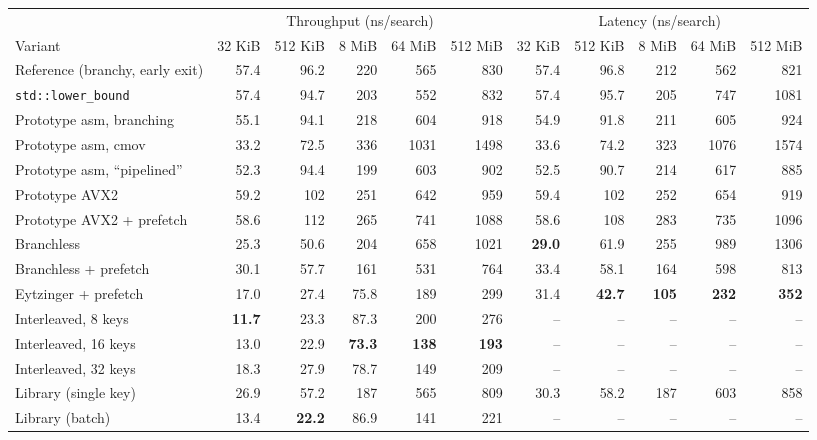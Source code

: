 \begin{tabular}{lrrrrr@{\hskip 1.2em}rrrrr}
\toprule
 & \multicolumn{5}{c}{Throughput (ns/search)} & \multicolumn{5}{c}{Latency (ns/search)}\\
\cmidrule(lr){2-6}\cmidrule(lr){7-11}
Variant & \multicolumn{1}{c}{32 KiB} & \multicolumn{1}{c}{512 KiB} & \multicolumn{1}{c}{8 MiB} & \multicolumn{1}{c}{64 MiB} & \multicolumn{1}{c}{512 MiB} & \multicolumn{1}{c}{32 KiB} & \multicolumn{1}{c}{512 KiB} & \multicolumn{1}{c}{8 MiB} & \multicolumn{1}{c}{64 MiB} & \multicolumn{1}{c}{512 MiB}\\
\midrule
Reference (branchy, early exit) & 57.4 & 96.2 & 220 & 565 & 830 & 57.4 & 96.8 & 212 & 562 & 821\\
\texttt{std::lower\_bound} & 57.4 & 94.7 & 203 & 552 & 832 & 57.4 & 95.7 & 205 & 747 & 1081\\
Prototype asm, branching & 55.1 & 94.1 & 218 & 604 & 918 & 54.9 & 91.8 & 211 & 605 & 924\\
Prototype asm, cmov & 33.2 & 72.5 & 336 & 1031 & 1498 & 33.6 & 74.2 & 323 & 1076 & 1574\\
Prototype asm, ``pipelined'' & 52.3 & 94.4 & 199 & 603 & 902 & 52.5 & 90.7 & 214 & 617 & 885\\
Prototype AVX2 & 59.2 & 102 & 251 & 642 & 959 & 59.4 & 102 & 252 & 654 & 919\\
Prototype AVX2 + prefetch & 58.6 & 112 & 265 & 741 & 1088 & 58.6 & 108 & 283 & 735 & 1096\\
Branchless & 25.3 & 50.6 & 204 & 658 & 1021 & \textbf{29.0} & 61.9 & 255 & 989 & 1306\\
Branchless + prefetch & 30.1 & 57.7 & 161 & 531 & 764 & 33.4 & 58.1 & 164 & 598 & 813\\
Eytzinger + prefetch & 17.0 & 27.4 & 75.8 & 189 & 299 & 31.4 & \textbf{42.7} & \textbf{105} & \textbf{232} & \textbf{352}\\
Interleaved, 8 keys & \textbf{11.7} & 23.3 & 87.3 & 200 & 276 & -- & -- & -- & -- & --\\
Interleaved, 16 keys & 13.0 & 22.9 & \textbf{73.3} & \textbf{138} & \textbf{193} & -- & -- & -- & -- & --\\
Interleaved, 32 keys & 18.3 & 27.9 & 78.7 & 149 & 209 & -- & -- & -- & -- & --\\
Library (single key) & 26.9 & 57.2 & 187 & 565 & 809 & 30.3 & 58.2 & 187 & 603 & 858\\
Library (batch) & 13.4 & \textbf{22.2} & 86.9 & 141 & 221 & -- & -- & -- & -- & --\\
\bottomrule
\end{tabular}
